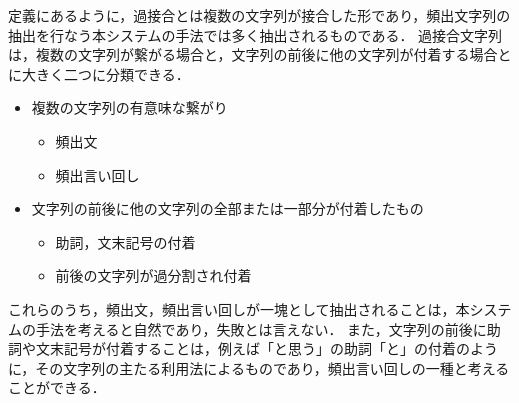 定義にあるように，過接合とは複数の文字列が接合した形であり，頻出文字列の抽出を行なう本システムの手法では多く抽出されるものである．
過接合文字列は，複数の文字列が繋がる場合と，文字列の前後に他の文字列が付着する場合とに大きく二つに分類できる．

\begin{itemize}
\item 複数の文字列の有意味な繋がり
\begin{itemize}
\item 頻出文
\item 頻出言い回し
\end{itemize}
\item 文字列の前後に他の文字列の全部または一部分が付着したもの
\begin{itemize}
\item 助詞，文末記号の付着
\item 前後の文字列が過分割され付着
\end{itemize}
\end{itemize}

これらのうち，頻出文，頻出言い回しが一塊として抽出されることは，本システムの手法を考えると自然であり，失敗とは言えない．
また，文字列の前後に助詞や文末記号が付着することは，例えば「と思う」の助詞「と」の付着のように，その文字列の主たる利用法によるものであり，頻出言い回しの一種と考えることができる．

